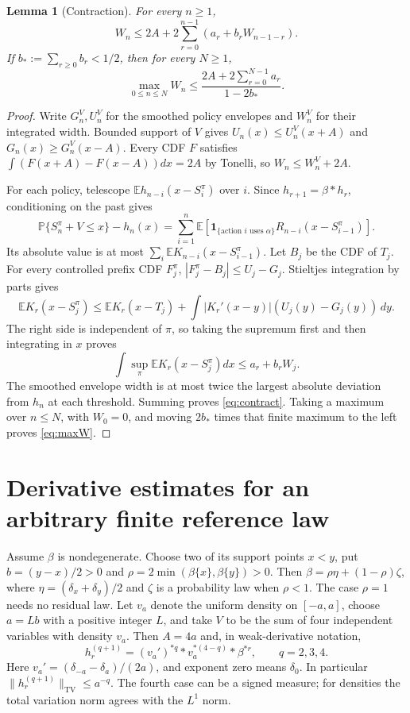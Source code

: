 \documentclass[11pt,a4paper]{article}
\newtheorem{lemma}[theorem]{Lemma}
\newcommand{\E}{\mathbb E}
\newcommand{\Prb}{\mathbb P}
\newcommand{\TV}{\mathrm{TV}}
\begin{document}
\begin{lemma}[Contraction]\label{lem:contraction}
For every $n\ge1$,
\begin{equation}\label{eq:contract}
W_n\le2A+2\sum_{r=0}^{n-1}(a_r+b_rW_{n-1-r}).
\end{equation}
If $b_*:=\sum_{r\ge0}b_r<1/2$, then for every $N\ge1$,
\begin{equation}\label{eq:maxW}
\max_{0\le n\le N}W_n
\le\frac{2A+2\sum_{r=0}^{N-1}a_r}{1-2b_*}.
\end{equation}
\end{lemma}
\begin{proof}
Write $G_n^V,U_n^V$ for the smoothed policy envelopes and $W_n^V$ for
their integrated width. Bounded support of $V$ gives
$U_n(x)\le U_n^V(x+A)$ and $G_n(x)\ge G_n^V(x-A)$.
Every CDF $F$ satisfies $\int(F(x+A)-F(x-A))dx=2A$ by Tonelli, so
$W_n\le W_n^V+2A$.

For each policy, telescope $\E h_{n-i}(x-S_i^\pi)$ over $i$.
Since $h_{r+1}=\beta*h_r$, conditioning on the past gives
\[
\Prb\{S_n^\pi+V\le x\}-h_n(x)
=\sum_{i=1}^n\E\left[
\mathbf1_{\{\text{action }i\text{ uses }\alpha\}}
R_{n-i}(x-S_{i-1}^\pi)\right].
\]
Its absolute value is at most
$\sum_i\E K_{n-i}(x-S_{i-1}^\pi)$.
Let $B_j$ be the CDF of $T_j$. For every controlled prefix CDF $F_j^\pi$,
$|F_j^\pi-B_j|\le U_j-G_j$. Stieltjes integration by parts gives
\[
\E K_r(x-S_j^\pi)\le\E K_r(x-T_j)
+\int|K_r'(x-y)|(U_j(y)-G_j(y))\,dy.
\]
The right side is independent of $\pi$, so taking the supremum first
and then integrating in $x$ proves
\[
\int\sup_\pi\E K_r(x-S_j^\pi)dx\le a_r+b_rW_j.
\]
The smoothed envelope width is at most twice the largest absolute
deviation from $h_n$ at each threshold. Summing proves
\eqref{eq:contract}. Taking a maximum over $n\le N$, with $W_0=0$,
and moving $2b_*$ times that finite maximum to the left proves
\eqref{eq:maxW}.
\end{proof}

\section{Derivative estimates for an arbitrary finite reference law}
Assume $\beta$ is nondegenerate. Choose two of its support points
$x<y$, put $b=(y-x)/2>0$ and
$\rho=2\min(\beta\{x\},\beta\{y\})>0$.
Then $\beta=\rho\eta+(1-\rho)\zeta$, where
$\eta=(\delta_x+\delta_y)/2$ and $\zeta$ is a probability law when
$\rho<1$. The case $\rho=1$ needs no residual law.
Let $v_a$ denote the uniform density on $[-a,a]$, choose
$a=Lb$ with a positive integer $L$, and take $V$ to be the sum of
four independent variables with density $v_a$. Then $A=4a$ and, in
weak-derivative notation,
\begin{equation}\label{eq:derivative}
h_r^{(q+1)}=(v_a')^{*q}*v_a^{*(4-q)}*\beta^{*r},
\qquad q=2,3,4.
\end{equation}
Here $v_a'=(\delta_{-a}-\delta_a)/(2a)$, and exponent zero means
$\delta_0$. In particular $\|h_r^{(q+1)}\|_{\TV}\le a^{-q}$.
The fourth case can be a signed measure; for densities the total
variation norm agrees with the $L^1$ norm.
\end{document}
